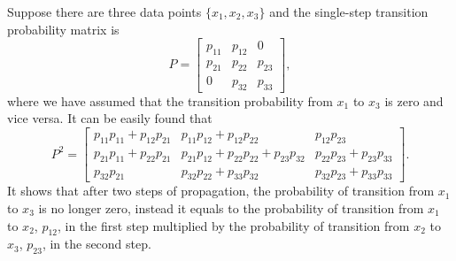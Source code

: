 Suppose there are three data points $\{x_1, x_2, x_3\}$ and the single-step transition probability matrix is
\begin{equation}
  P=\begin{bmatrix}
	p_{11} & p_{12} & 0\\
	p_{21} & p_{22} & p_{23} \\
	0      & p_{32} & p_{33}
\end{bmatrix},
\end{equation}
where we have assumed that the transition probability from $x_1$ to $x_3$ is zero and vice versa. It can be easily found that
\begin{equation}
  P^2=
  \begin{bmatrix}
  	p_{11}p_{11}+p_{12}p_{21} & p_{11}p_{12}+p_{12}p_{22} & p_{12}p_{23}\\
  	p_{21}p_{11}+p_{22}p_{21} & p_{21}p_{12}+p_{22}p_{22}+p_{23}p_{32} & p_{22}p_{23}+p_{23}p_{33} \\
  	p_{32}p_{21}      & p_{32}p_{22}+p_{33}p_{32} & p_{32}p_{23}+p_{33}p_{33}
  \end{bmatrix}.
\end{equation}
It shows that after two steps of propagation, the probability of transition from $x_1$ to $x_3$ is no longer zero, instead it equals to the probability of transition from $x_1$ to $x_2$, $p_{12}$, in the first step multiplied by the probability of transition from $x_2$ to $x_3$, $p_{23}$, in the second step.